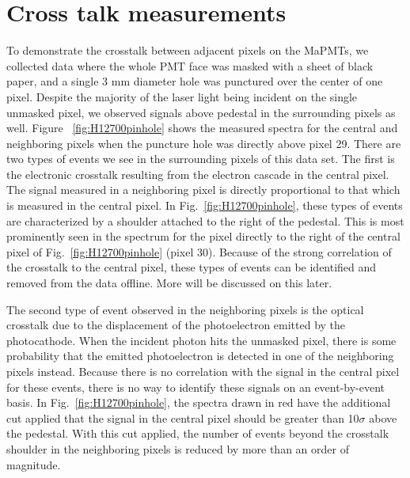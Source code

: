 \section{Cross talk measurements}

To demonstrate the crosstalk between adjacent pixels on the MaPMTs, we collected data where the whole PMT face was masked with a sheet of black paper, and a single 3 mm diameter hole was punctured over the center of one pixel. Despite the majority of the laser light being incident on the single unmasked pixel, we observed signals above pedestal in the surrounding pixels as well. Figure ~\ref{fig:H12700pinhole} shows the measured spectra for the central and neighboring pixels when the puncture hole was directly above pixel 29. There are two types of events we see in the surrounding pixels of this data set. The first is the electronic crosstalk resulting from the electron cascade in the central pixel. The signal measured in a neighboring pixel is directly proportional to that which is measured in the central pixel. In Fig.~\ref{fig:H12700pinhole}, these types of events are characterized by a shoulder attached to the right of the pedestal. This is most prominently seen in the spectrum for the pixel directly to the right of the central pixel of Fig.~\ref{fig:H12700pinhole} (pixel 30). Because of the strong correlation of the crosstalk to the central pixel, these types of events can be identified and removed from the data offline. More will be discussed on this later.

The second type of event observed in the neighboring pixels is 
the optical crosstalk due to
the displacement of the photoelectron emitted by the photocathode. When the incident photon hits the unmasked pixel, there is some probability that the emitted photoelectron is detected in one of the neighboring pixels instead. Because there is no correlation with the signal in the central pixel for these events, there is no way to identify these signals on an event-by-event basis. In Fig.~\ref{fig:H12700pinhole}, the spectra drawn in red have the additional cut applied that the signal in the central pixel should be greater than 10$\sigma$ above the pedestal. With this cut applied, the number of events beyond the crosstalk shoulder in the neighboring pixels is reduced by more than an order of magnitude.



